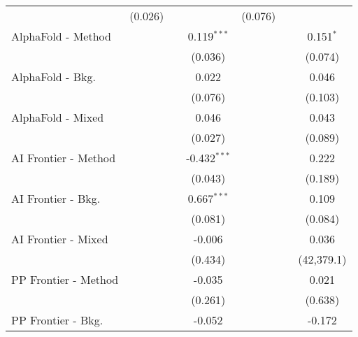 \begin{tabular}{lcccccc}
                                  & (0.026)        &               &                & (0.076)       &              &   \\   
   AlphaFold - Method             &                &               & 0.119$^{***}$  &               &              & 0.151$^{*}$\\   
                                  &                &               & (0.036)        &               &              & (0.074)\\   
   AlphaFold - Bkg.               &                &               & 0.022          &               &              & 0.046\\   
                                  &                &               & (0.076)        &               &              & (0.103)\\   
   AlphaFold - Mixed              &                &               & 0.046          &               &              & 0.043\\   
                                  &                &               & (0.027)        &               &              & (0.089)\\   
   AI Frontier - Method           &                &               & -0.432$^{***}$ &               &              & 0.222\\   
                                  &                &               & (0.043)        &               &              & (0.189)\\   
   AI Frontier - Bkg.             &                &               & 0.667$^{***}$  &               &              & 0.109\\   
                                  &                &               & (0.081)        &               &              & (0.084)\\   
   AI Frontier - Mixed            &                &               & -0.006         &               &              & 0.036\\   
                                  &                &               & (0.434)        &               &              & (42,379.1)\\   
   PP Frontier - Method           &                &               & -0.035         &               &              & 0.021\\   
                                  &                &               & (0.261)        &               &              & (0.638)\\   
   PP Frontier - Bkg.             &                &               & -0.052         &               &              & -0.172\\   

\end{tabular}
